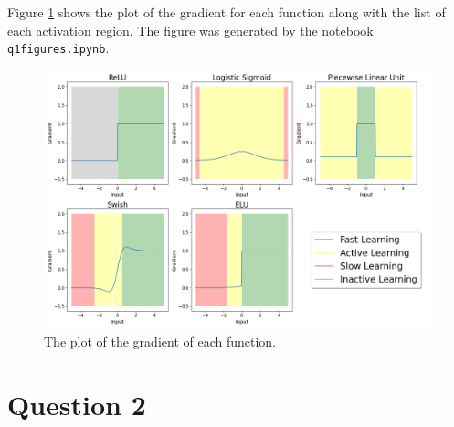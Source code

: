 \documentclass[
	12pt, %
]{../Template/fphw}
\begin{document}
Figure \ref{fig:gradients_q1} shows the plot of the gradient for each function along with the list of each activation region. The figure was generated by the notebook \verb|q1figures.ipynb|.

\begin{figure}[!htbp]
    \centering
    \includegraphics[width=18cm]{HW1/gradient_plot_q1.png}
    \caption{The plot of the gradient of each function.}
    \label{fig:gradients_q1}
\end{figure}


\section*{Question 2}
\end{document}
